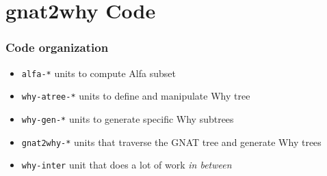 \documentclass{beamer}
\newenvironment{specialframe}{%
  \begin{frame}[fragile,environment=specialframe]}{\end{frame}}
\begin{document}
\section{gnat2why Code}
\begin{specialframe}\frametitle{Code organization}
   \begin{itemize}
      \item \verb|alfa-*|       units to compute Alfa subset
      \item \verb|why-atree-*|  units to define and manipulate Why tree
      \item \verb|why-gen-*|    units to generate specific Why subtrees
      \item \verb|gnat2why-*|   units that traverse the GNAT tree and generate
         Why trees
      \item \verb|why-inter|    unit that does a lot of work \emph{in between}
   \end{itemize}
\end{specialframe}
\end{document}
